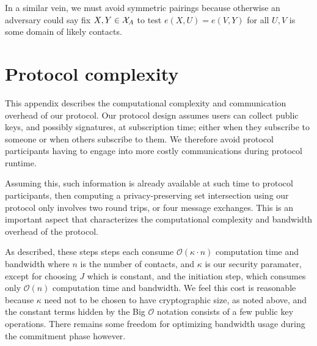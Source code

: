 \documentclass{article}
\begin{document}

In a similar vein, we must avoid symmetric pairings because otherwise
an adversary could say fix $X,Y \in {\cal X}_A$ to test
$e(X,U) = e(V,Y)$ for all $U,V$ is some domain of likely contacts.

\section{Protocol complexity}
%
This appendix describes the computational complexity and
communication overhead of our protocol. Our protocol
design assumes users can collect public keys, and possibly signatures, at
subscription time; either when they subscribe to someone or when
others subscribe to them. We therefore avoid protocol participants
having to engage into more costly communications during protocol
runtime.

Assuming this, such information is already available at such time to protocol
participants, then computing a privacy-preserving set intersection
using our protocol only involves two round trips, or four message
exchanges. This is an important aspect that characterizes the
computational complexity and bandwidth overhead of the protocol.

As described, these steps steps each consume $\mathcal{O}(\kappa \cdot n)$ computation
time and bandwidth where $n$ is the number of contacts, and $\kappa$
is our security paramater, except for choosing $J$ which is constant,
and the initiation step, which consumes only $\mathcal{O}(n)$ computation time
and bandwidth.  We feel this cost is reasonable because $\kappa$ need
not to be chosen to have cryptographic size, as noted above, and the
constant terms hidden by the Big $\mathcal{O}$ notation consists of a few public key
operations. There remains some freedom for optimizing bandwidth usage
during the commitment phase however.

\medskip
\end{document}
